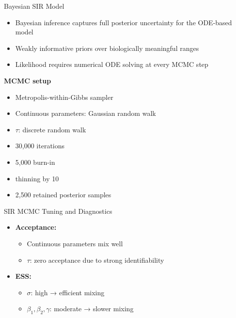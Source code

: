 \documentclass[
  ignorenonframetext,
  aspectratio=169,
]{beamer}
\providecommand{\tightlist}{%
  \setlength{\itemsep}{0pt}\setlength{\parskip}{0pt}}\usepackage{longtable,booktabs,array}
\begin{document}
\begin{frame}{Bayesian SIR Model}
\label{bayesian-sir-model}
\begin{itemize}
\tightlist
\item
  Bayesian inference captures full posterior uncertainty for the
  ODE-based model
\item
  Weakly informative priors over biologically meaningful ranges
\item
  Likelihood requires numerical ODE solving at every MCMC step
\end{itemize}

\textbf{MCMC setup}

\begin{itemize}
\tightlist
\item
  Metropolis-within-Gibbs sampler
\item
  Continuous parameters: Gaussian random walk
\item
  \(\tau\): discrete random walk
\item
  30,000 iterations
\item
  5,000 burn-in
\item
  thinning by 10
\item
  2,500 retained posterior samples
\end{itemize}
\end{frame}

\begin{frame}{SIR MCMC Tuning and Diagnostics}
\label{sir-mcmc-tuning-and-diagnostics}
\begin{itemize}
\tightlist
\item
  \textbf{Acceptance:}

  \begin{itemize}
  \tightlist
  \item
    Continuous parameters mix well
  \item
    \(\tau\): zero acceptance due to strong identifiability
  \end{itemize}
\item
  \textbf{ESS:}

  \begin{itemize}
  \tightlist
  \item
    \(\sigma\): high → efficient mixing\\
  \item
    \(\beta_1, \beta_2, \gamma\): moderate → slower mixing
  \end{itemize}
\end{itemize}
\end{frame}
\end{document}
